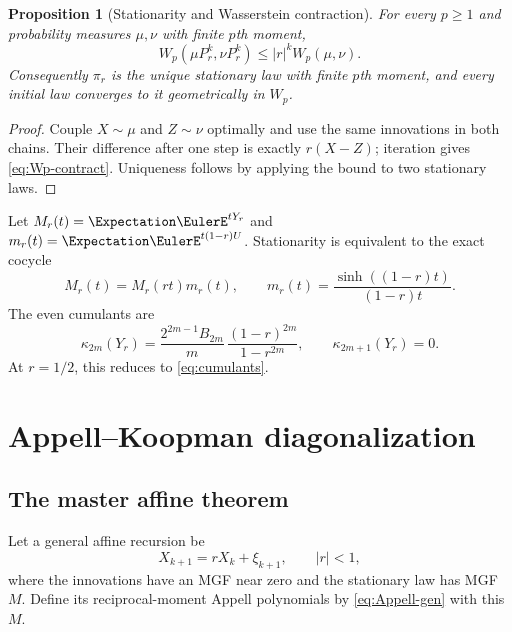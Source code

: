 \documentclass[11pt,a4paper]{article}
\newtheorem{proposition}[theorem]{Proposition}
\theoremstyle{definition}
\theoremstyle{remark}
\begin{document}
\begin{proposition}[Stationarity and Wasserstein contraction]
\label{prop:contraction}
For every $p\ge1$ and probability measures $\mu,\nu$ with finite $p$th moment,
\begin{equation}
 W_p(\mu P_r^k,\nu P_r^k)\le |r|^kW_p(\mu,\nu).
 \label{eq:Wp-contract}
\end{equation}
Consequently $\pi_r$ is the unique stationary law with finite $p$th moment, and every initial law converges to it geometrically in $W_p$.
\end{proposition}

\begin{proof}
Couple $X\sim\mu$ and $Z\sim\nu$ optimally and use the same innovations in both chains. Their difference after one step is exactly $r(X-Z)$; iteration gives \eqref{eq:Wp-contract}. Uniqueness follows by applying the bound to two stationary laws.
\end{proof}

Let $M_r(t)=\Expectation\EulerE^{tY_r}$ and $m_r(t)=\Expectation\EulerE^{t(1-r)U}$. Stationarity is equivalent to the exact cocycle
\begin{equation}
 M_r(t)=M_r(rt)m_r(t),
 \qquad
 m_r(t)=\frac{\sinh((1-r)t)}{(1-r)t}.
 \label{eq:Mr-cocycle}
\end{equation}
The even cumulants are
\begin{equation}
 \kappa_{2m}(Y_r)
 =\frac{2^{2m-1}B_{2m}}{m}\,
 \frac{(1-r)^{2m}}{1-r^{2m}},
 \qquad \kappa_{2m+1}(Y_r)=0.
 \label{eq:r-cumulants}
\end{equation}
At $r=1/2$, this reduces to \eqref{eq:cumulants}.

\section{Appell--Koopman diagonalization}
\label{sec:koopman}

\subsection{The master affine theorem}

Let a general affine recursion be
\begin{equation}
 X_{k+1}=rX_k+\xi_{k+1},
 \qquad |r|<1,
 \label{eq:general-AR}
\end{equation}
where the innovations have an MGF near zero and the stationary law has MGF $M$. Define its reciprocal-moment Appell polynomials by \eqref{eq:Appell-gen} with this $M$.
\end{document}

